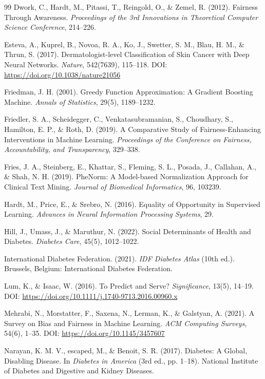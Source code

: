 \begin{thebibliography}{99}
Dwork, C., Hardt, M., Pitassi, T., Reingold, O., \& Zemel, R. (2012). 
Fairness Through Awareness. \textit{Proceedings of the 3rd Innovations in 
Theoretical Computer Science Conference}, 214--226.

Esteva, A., Kuprel, B., Novoa, R. A., Ko, J., Swetter, S. M., Blau, H. M., 
\& Thrun, S. (2017). Dermatologist-level Classification of Skin Cancer with 
Deep Neural Networks. \textit{Nature}, 542(7639), 115--118. 
DOI: \url{https://doi.org/10.1038/nature21056}

Friedman, J. H. (2001). Greedy Function Approximation: A Gradient Boosting 
Machine. \textit{Annals of Statistics}, 29(5), 1189--1232.

Friedler, S. A., Scheidegger, C., Venkatasubramanian, S., Choudhary, S., 
Hamilton, E. P., \& Roth, D. (2019). A Comparative Study of Fairness-Enhancing 
Interventions in Machine Learning. \textit{Proceedings of the Conference on 
Fairness, Accountability, and Transparency}, 329--338.

Fries, J. A., Steinberg, E., Khattar, S., Fleming, S. L., Posada, J., 
Callahan, A., \& Shah, N. H. (2019). PheNorm: A Model-based Normalization 
Approach for Clinical Text Mining. \textit{Journal of Biomedical Informatics}, 
96, 103239.

Hardt, M., Price, E., \& Srebro, N. (2016). Equality of Opportunity in 
Supervised Learning. \textit{Advances in Neural Information Processing 
Systems}, 29.

Hill, J., Umass, J., \& Maruthur, N. (2022). Social Determinants of Health 
and Diabetes. \textit{Diabetes Care}, 45(5), 1012--1022.

International Diabetes Federation. (2021). \textit{IDF Diabetes Atlas} 
(10th ed.). Brussels, Belgium: International Diabetes Federation.

Lum, K., \& Isaac, W. (2016). To Predict and Serve? \textit{Significance}, 
13(5), 14--19. DOI: \url{https://doi.org/10.1111/j.1740-9713.2016.00960.x}

Mehrabi, N., Morstatter, F., Saxena, N., Lerman, K., \& Galstyan, A. (2021). 
A Survey on Bias and Fairness in Machine Learning. \textit{ACM Computing 
Surveys}, 54(6), 1--35. DOI: \url{https://doi.org/10.1145/3457607}

Narayan, K. M. V., escaped{,} M., \& Benoit, S. R. (2017). Diabetes: A 
Global, Disabling Disease. In \textit{Diabetes in America} (3rd ed., 
pp. 1--18). National Institute of Diabetes and Digestive and Kidney Diseases.


\end{thebibliography}
